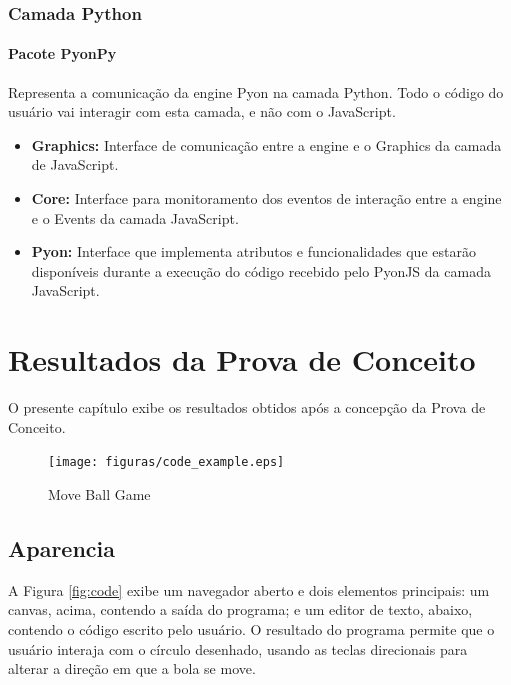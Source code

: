 \begin{apendicesenv}
\subsection{Camada Python}

\subsubsection{Pacote PyonPy}

Representa a comunicação da engine Pyon na camada Python. Todo o código do usuário vai interagir com esta camada, e não com o JavaScript. 

\begin{itemize}
    \item \textbf{Graphics:} Interface de comunicação entre a engine e o Graphics da camada de JavaScript.
    \item \textbf{Core:} Interface para monitoramento dos eventos de interação entre a engine e o Events da camada JavaScript.
    \item \textbf{Pyon:} Interface que implementa atributos e funcionalidades que estarão disponíveis durante a execução do código recebido pelo PyonJS da camada JavaScript.
\end{itemize}

%
%

\chapter[Resultados da Prova de Conceito]{Resultados da Prova de Conceito}
\label{apendice:resultados_poc}

O presente capítulo exibe os resultados obtidos após a concepção da Prova de Conceito.

\begin{figure}[!ht]
    \centering
    \caption{Move Ball Game}
    \texttt{[image: figuras/code\_example.eps]}
    \label{fig:arquitetura_poc_code}
\end{figure}

\section{Aparencia}

A Figura \ref{fig:code} exibe um navegador aberto e dois elementos principais: um canvas, acima, contendo a saída do programa; e um editor de texto, abaixo, contendo o código escrito pelo usuário. O resultado do programa permite que o usuário interaja com o círculo desenhado, usando as teclas direcionais para alterar a direção em que a bola se move. 


\end{apendicesenv}
